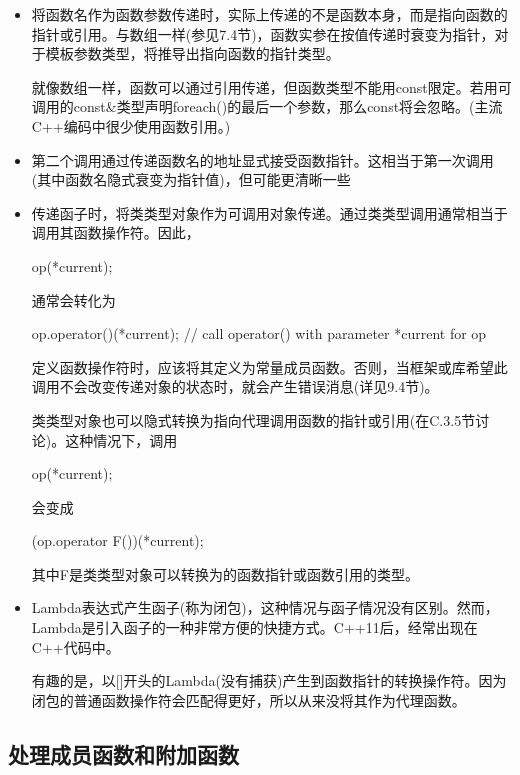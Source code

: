 \begin{itemize}
\item
将函数名作为函数参数传递时，实际上传递的不是函数本身，而是指向函数的指针或引用。与数组一样(参见7.4节)，函数实参在按值传递时衰变为指针，对于模板参数类型，将推导出指向函数的指针类型。

就像数组一样，函数可以通过引用传递，但函数类型不能用const限定。若用可调用的const\&类型声明foreach()的最后一个参数，那么const将会忽略。(主流C++编码中很少使用函数引用。)

\item
第二个调用通过传递函数名的地址显式接受函数指针。这相当于第一次调用(其中函数名隐式衰变为指针值)，但可能更清晰一些

\item
传递函子时，将类类型对象作为可调用对象传递。通过类类型调用通常相当于调用其函数操作符。因此，

\begin{cpp}
op(*current);
\end{cpp}

通常会转化为

\begin{cpp}
op.operator()(*current); // call operator() with parameter *current for op
\end{cpp}

定义函数操作符时，应该将其定义为常量成员函数。否则，当框架或库希望此调用不会改变传递对象的状态时，就会产生错误消息(详见9.4节)。

类类型对象也可以隐式转换为指向代理调用函数的指针或引用(在C.3.5节讨论)。这种情况下，调用

\begin{cpp}
op(*current);
\end{cpp}

会变成

\begin{cpp}
(op.operator F())(*current);
\end{cpp}

其中F是类类型对象可以转换为的函数指针或函数引用的类型。

\item
Lambda表达式产生函子(称为闭包)，这种情况与函子情况没有区别。然而，Lambda是引入函子的一种非常方便的快捷方式。C++11后，经常出现在C++代码中。

有趣的是，以[]开头的Lambda(没有捕获)产生到函数指针的转换操作符。因为闭包的普通函数操作符会匹配得更好，所以从来没将其作为代理函数。
\end{itemize}

\subsection{处理成员函数和附加函数}

